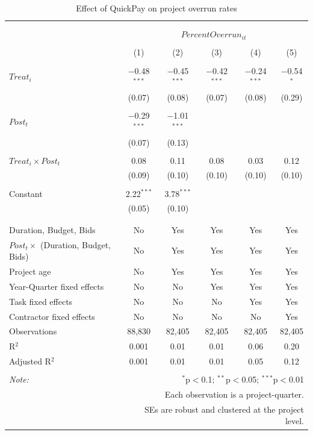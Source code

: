 \documentclass[
]{article}
\begin{document}
\begin{table}[H] \centering 
  \caption{Effect of QuickPay on project overrun rates} 
  \label{} 
\small 
\begin{tabular}{@{\extracolsep{-2pt}}lccccc} 
\\[-1.8ex]\hline 
\hline \\[-1.8ex] 
\\[-1.8ex] & \multicolumn{5}{c}{$PercentOverrun_{it}$} \\ 
\\[-1.8ex] & (1) & (2) & (3) & (4) & (5)\\ 
\hline \\[-1.8ex] 
 $Treat_i$ & $-$0.48$^{***}$ & $-$0.45$^{***}$ & $-$0.42$^{***}$ & $-$0.24$^{***}$ & $-$0.54$^{*}$ \\ 
  & (0.07) & (0.08) & (0.07) & (0.08) & (0.29) \\ 
  & & & & & \\ 
 $Post_t$ & $-$0.29$^{***}$ & $-$1.01$^{***}$ &  &  &  \\ 
  & (0.07) & (0.13) &  &  &  \\ 
  & & & & & \\ 
 $Treat_i \times Post_t$ & 0.08 & 0.11 & 0.08 & 0.03 & 0.12 \\ 
  & (0.09) & (0.10) & (0.10) & (0.10) & (0.10) \\ 
  & & & & & \\ 
 Constant & 2.22$^{***}$ & 3.78$^{***}$ &  &  &  \\ 
  & (0.05) & (0.10) &  &  &  \\ 
  & & & & & \\ 
\hline \\[-1.8ex] 
Duration, Budget, Bids & No & Yes & Yes & Yes & Yes \\ 
$Post_t \times$  (Duration, Budget, Bids) & No & Yes & Yes & Yes & Yes \\ 
Project age & No & Yes & Yes & Yes & Yes \\ 
Year-Quarter fixed effects & No & No & Yes & Yes & Yes \\ 
Task fixed effects & No & No & No & Yes & Yes \\ 
Contractor fixed effects & No & No & No & No & Yes \\ 
Observations & 88,830 & 82,405 & 82,405 & 82,405 & 82,405 \\ 
R$^{2}$ & 0.001 & 0.01 & 0.01 & 0.06 & 0.20 \\ 
Adjusted R$^{2}$ & 0.001 & 0.01 & 0.01 & 0.05 & 0.12 \\ 
\hline 
\hline \\[-1.8ex] 
\textit{Note:}  & \multicolumn{5}{r}{$^{*}$p$<$0.1; $^{**}$p$<$0.05; $^{***}$p$<$0.01} \\ 
 & \multicolumn{5}{r}{Each observation is a project-quarter.} \\ 
 & \multicolumn{5}{r}{SEs are robust and clustered at the project level.} \\ 
\end{tabular} 
\end{table}
\end{document}
